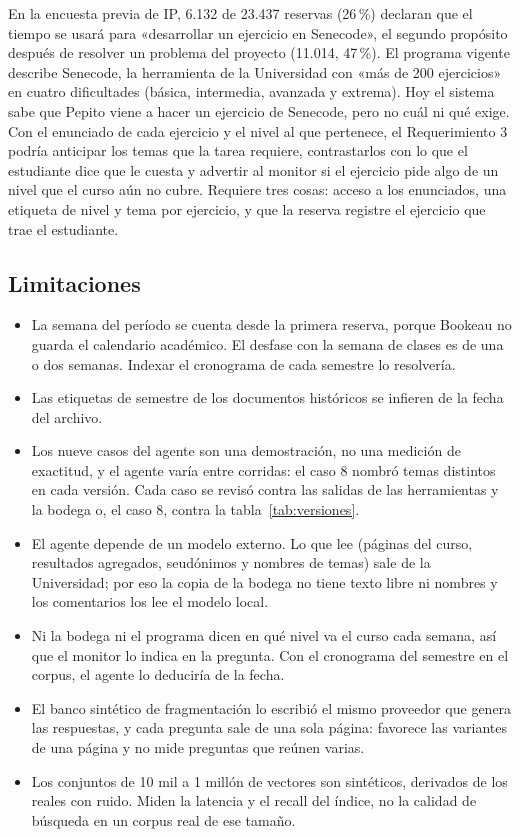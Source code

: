 \documentclass[11pt,letterpaper]{article}
\begin{document}
En la encuesta previa de IP, 6.132 de 23.437 reservas (26\,\%) declaran que el tiempo se usará para «desarrollar un ejercicio en Senecode», el segundo propósito después de resolver un problema del proyecto (11.014, 47\,\%). El programa vigente describe Senecode, la herramienta de la Universidad con «más de 200 ejercicios» en cuatro dificultades (básica, intermedia, avanzada y extrema). Hoy el sistema sabe que Pepito viene a hacer un ejercicio de Senecode, pero no cuál ni qué exige. Con el enunciado de cada ejercicio y el nivel al que pertenece, el Requerimiento 3 podría anticipar los temas que la tarea requiere, contrastarlos con lo que el estudiante dice que le cuesta y advertir al monitor si el ejercicio pide algo de un nivel que el curso aún no cubre. Requiere tres cosas: acceso a los enunciados, una etiqueta de nivel y tema por ejercicio, y que la reserva registre el ejercicio que trae el estudiante.

\subsection{Limitaciones}

\begin{itemize}[leftmargin=1.5em,itemsep=2pt]
\item La semana del período se cuenta desde la primera reserva, porque Bookeau no guarda el calendario académico. El desfase con la semana de clases es de una o dos semanas. Indexar el cronograma de cada semestre lo resolvería.
\item Las etiquetas de semestre de los documentos históricos se infieren de la fecha del archivo. 
\item Los nueve casos del agente son una demostración, no una medición de exactitud, y el agente varía entre corridas: el caso 8 nombró temas distintos en cada versión. Cada caso se revisó contra las salidas de las herramientas y la bodega o, el caso 8, contra la tabla~\ref{tab:versiones}.
\item El agente depende de un modelo externo. Lo que lee (páginas del curso, resultados agregados, seudónimos y nombres de temas) sale de la Universidad; por eso la copia de la bodega no tiene texto libre ni nombres y los comentarios los lee el modelo local.
\item Ni la bodega ni el programa dicen en qué nivel va el curso cada semana, así que el monitor lo indica en la pregunta. Con el cronograma del semestre en el corpus, el agente lo deduciría de la fecha.
\item El banco sintético de fragmentación lo escribió el mismo proveedor que genera las respuestas, y cada pregunta sale de una sola página: favorece las variantes de una página y no mide preguntas que reúnen varias.
\item Los conjuntos de 10 mil a 1 millón de vectores son sintéticos, derivados de los reales con ruido. Miden la latencia y el recall del índice, no la calidad de búsqueda en un corpus real de ese tamaño.
\end{itemize}
\end{document}
